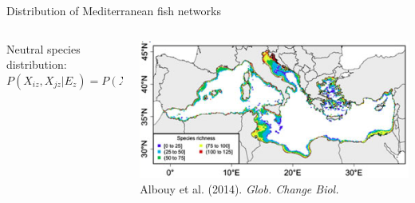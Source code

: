 \documentclass{eecslides}
\begin{document}
	\begin{frame}{Distribution of Mediterranean fish networks}
 	    	\begin{columns}
			\begin{column}{0.3\textwidth}							
				Neutral species distribution: \\
				$P(X_{iz},X_{jz}|E_z) = P(X_{iz}|E_z)P(X_{jz}|E_z)$
			\end{column}
			\begin{column}{0.7\textwidth}
				\includegraphics[height=0.4\textheight]{med_richness}\\
				\footnotesize{Albouy et al. (2014). \textit{Glob. Change Biol.}}
			\end{column}				
		\end{columns}	   
	\end{frame}

\end{document}
